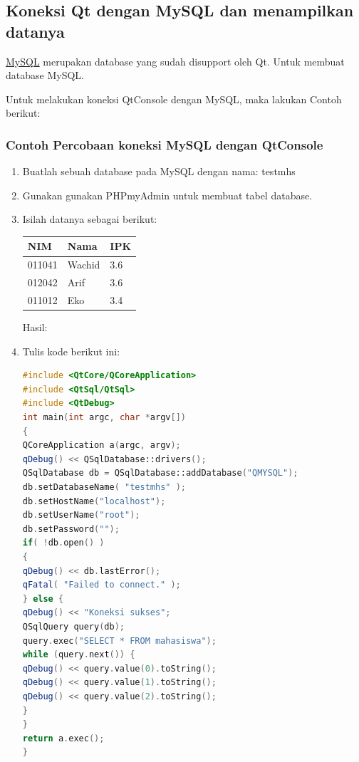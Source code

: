 \subsection{Koneksi Qt dengan MySQL dan menampilkan
datanya}\label{koneksi-qt-dengan-mysql-dan-menampilkan-datanya}

\href{https://www.mysql.com/}{MySQL} merupakan database yang sudah
disupport oleh Qt. Untuk membuat database MySQL.

Untuk melakukan koneksi QtConsole dengan MySQL, maka lakukan Contoh
berikut:

\subsubsection*{Contoh Percobaan koneksi MySQL dengan QtConsole}

\begin{enumerate}


\item
Buatlah sebuah database pada MySQL dengan nama: testmhs
\item
Gunakan gunakan PHPmyAdmin untuk membuat tabel database.


\item
Isilah datanya sebagai berikut:

\begin{longtable}[]{@{}lll@{}}
\toprule
NIM & Nama & IPK\tabularnewline
\midrule
\endhead
011041 & Wachid & 3.6\tabularnewline
012042 & Arif & 3.6\tabularnewline
011012 & Eko & 3.4\tabularnewline
\bottomrule
\end{longtable}

Hasil:


\item
Tulis kode berikut ini:


\begin{lstlisting}[language=c++, caption=Percobaan koneksi MySQL dengan QtConsole]
#include <QtCore/QCoreApplication>
#include <QtSql/QtSql>
#include <QtDebug>
int main(int argc, char *argv[])
{
QCoreApplication a(argc, argv);
qDebug() << QSqlDatabase::drivers();
QSqlDatabase db = QSqlDatabase::addDatabase("QMYSQL");
db.setDatabaseName( "testmhs" );
db.setHostName("localhost");
db.setUserName("root");
db.setPassword("");
if( !db.open() )
{
qDebug() << db.lastError();
qFatal( "Failed to connect." );
} else {
qDebug() << "Koneksi sukses";
QSqlQuery query(db);
query.exec("SELECT * FROM mahasiswa");
while (query.next()) {
qDebug() << query.value(0).toString();
qDebug() << query.value(1).toString();
qDebug() << query.value(2).toString();
}
}
return a.exec();
}
\end{lstlisting}


\end{enumerate}
